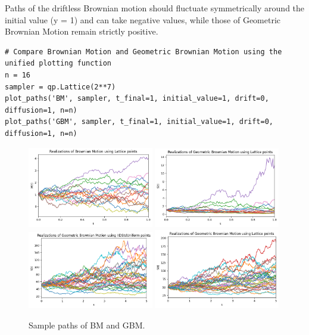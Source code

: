 \documentclass{article}
\begin{document}
Paths of the driftless Brownian motion should fluctuate symmetrically around the initial value (y = 1) and can take negative values, while those of Geometric Brownian Motion remain strictly positive.

\begin{verbatim}
# Compare Brownian Motion and Geometric Brownian Motion using the unified plotting function
n = 16
sampler = qp.Lattice(2**7)
plot_paths('BM', sampler, t_final=1, initial_value=1, drift=0, diffusion=1, n=n)
plot_paths('GBM', sampler, t_final=1, initial_value=1, drift=0, diffusion=1, n=n)
\end{verbatim}

\begin{figure}[h!]
\centering
\includegraphics[width=0.49\textwidth]{images/figure_1.png}
\includegraphics[width=0.49\textwidth]{images/figure_2.png}\\
\includegraphics[width=0.49\textwidth]{images/figure_3.png}
\includegraphics[width=0.49\textwidth]{images/figure_4.png}
\caption{Sample paths of BM and GBM.}
\end{figure}
\end{document}
